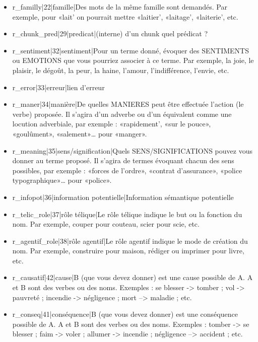 \documentclass[a4paper,11pt,french]{article}
\begin{document}
\begin{itemize}
\item r\_familly|22|famille|Des mots de la même famille sont demandés. Par exemple, pour «lait' on pourrait mettre «laitier', «laitage', «laiterie', etc.

\item r\_chunk\_pred|29|predicat|(interne) d'un chunk quel prédicat ?

\item r\_sentiment|32|sentiment|Pour un terme donné, évoquer des SENTIMENTS ou EMOTIONS que vous pourriez associer à ce terme. Par exemple, la joie, le plaisir, le dégoût, la peur, la haine, l'amour, l'indifférence, l'envie, etc.

\item r\_error|33|erreur|lien d'erreur

\item r\_maner|34|manière|De quelles MANIERES peut être effectuée l'action (le verbe) proposée. Il s'agira d'un adverbe ou d'un équivalent comme une locution adverbiale, par exemple : «rapidement', «sur le pouce», «goulûment», «salement»\dots{} pour «manger».

\item r\_meaning|35|sens/signification|Quels SENS/SIGNIFICATIONS pouvez vous donner au terme proposé. Il s'agira de termes évoquant chacun des sens possibles, par exemple : «forces de l'ordre», «contrat d'assurance», «police typographique»\dots{} pour «police».

\item r\_infopot|36|information potentielle|Information sémantique potentielle

\item r\_telic\_role|37|rôle télique|Le rôle télique indique le but ou la fonction du nom. Par exemple, couper pour couteau, scier pour scie, etc.

\item r\_agentif\_role|38|rôle agentif|Le rôle agentif indique le mode de création du nom. Par exemple, construire pour maison, rédiger ou imprimer pour livre, etc.

\item r\_causatif|42|cause|B (que vous devez donner) est une cause possible de A. A et B sont des verbes ou des noms.  Exemples : se blesser -> tomber ; vol -> pauvreté ; incendie -> négligence ; mort --> maladie ; etc.

\item r\_conseq|41|conséquence|B (que vous devez donner) est une conséquence possible de A. A et B sont des verbes ou des noms.  Exemples : tomber -> se blesser ; faim -> voler ; allumer -> incendie ; négligence --> accident ; etc.


\end{itemize}
\end{document}
